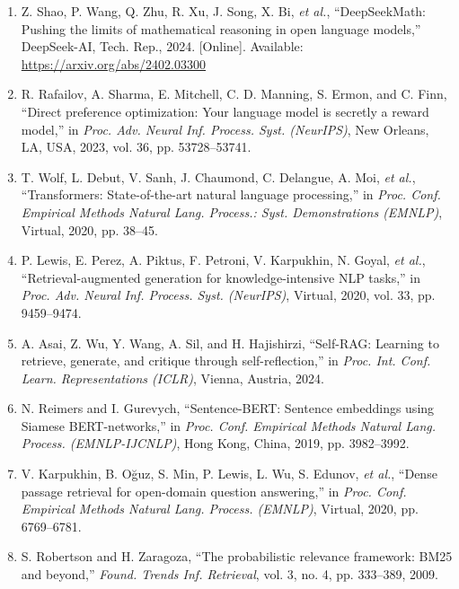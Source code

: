 \begin{enumerate}
\item\label{ref:shao2024}
  Z. Shao, P. Wang, Q. Zhu, R. Xu, J. Song, X. Bi, \emph{et al.},
  ``DeepSeekMath: Pushing the limits of mathematical reasoning in open
  language models,'' DeepSeek-AI, Tech. Rep., 2024. [Online]. Available:
  \url{https://arxiv.org/abs/2402.03300}

\item\label{ref:rafailov2023}
  R. Rafailov, A. Sharma, E. Mitchell, C. D. Manning, S. Ermon, and C. Finn,
  ``Direct preference optimization: Your language model is secretly a reward
  model,'' in \emph{Proc. Adv. Neural Inf. Process. Syst. (NeurIPS)},
  New Orleans, LA, USA, 2023, vol. 36, pp. 53728--53741.

\item\label{ref:wolf2020}
  T. Wolf, L. Debut, V. Sanh, J. Chaumond, C. Delangue, A. Moi,
  \emph{et al.}, ``Transformers: State-of-the-art natural language
  processing,'' in \emph{Proc. Conf. Empirical Methods Natural Lang.
  Process.: Syst. Demonstrations (EMNLP)}, Virtual, 2020, pp. 38--45.

\item\label{ref:lewis2020}
  P. Lewis, E. Perez, A. Piktus, F. Petroni, V. Karpukhin, N. Goyal,
  \emph{et al.}, ``Retrieval-augmented generation for knowledge-intensive
  NLP tasks,'' in \emph{Proc. Adv. Neural Inf. Process. Syst. (NeurIPS)},
  Virtual, 2020, vol. 33, pp. 9459--9474.

\item\label{ref:asai2024}
  A. Asai, Z. Wu, Y. Wang, A. Sil, and H. Hajishirzi, ``Self-RAG: Learning
  to retrieve, generate, and critique through self-reflection,'' in
  \emph{Proc. Int. Conf. Learn. Representations (ICLR)}, Vienna, Austria,
  2024.

\item\label{ref:reimers2019}
  N. Reimers and I. Gurevych, ``Sentence-BERT: Sentence embeddings using
  Siamese BERT-networks,'' in \emph{Proc. Conf. Empirical Methods Natural
  Lang. Process. (EMNLP-IJCNLP)}, Hong Kong, China, 2019, pp. 3982--3992.

\item\label{ref:karpukhin2020}
  V. Karpukhin, B. Oğuz, S. Min, P. Lewis, L. Wu, S. Edunov,
  \emph{et al.}, ``Dense passage retrieval for open-domain question
  answering,'' in \emph{Proc. Conf. Empirical Methods Natural Lang. Process.
  (EMNLP)}, Virtual, 2020, pp. 6769--6781.

\item\label{ref:robertson2009}
  S. Robertson and H. Zaragoza, ``The probabilistic relevance framework:
  BM25 and beyond,'' \emph{Found. Trends Inf. Retrieval}, vol. 3, no. 4,
  pp. 333--389, 2009.


\end{enumerate}
